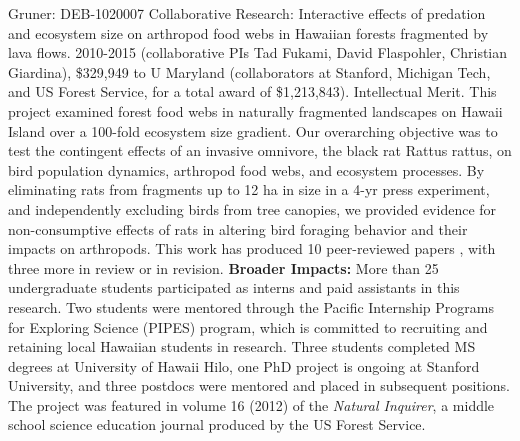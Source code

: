 \documentclass[11pt]{article}
\makeatletter
\renewcommand{\paragraph}{\@startsection{paragraph}{4}{\z@}
  {1ex \@plus 1ex \@minus .2ex}{-1em}
  {\normalfont\normalsize\it}
}
\makeatother
\begin{document}
\paragraph{Gruner:} DEB-1020007 Collaborative Research: Interactive
effects of predation and ecosystem size on arthropod food webs in
Hawaiian forests fragmented by lava flows. 2010-2015 (collaborative
PIs Tad Fukami, David Flaspohler, Christian Giardina), \$329,949 to U
Maryland (collaborators at Stanford, Michigan Tech, and US Forest
Service, for a total award of \$1,213,843). Intellectual Merit. This
project examined forest food webs in naturally fragmented landscapes
on Hawaii Island over a 100-fold ecosystem size gradient. Our
overarching objective was to test the contingent effects of an
invasive omnivore, the black rat Rattus rattus, on bird population
dynamics, arthropod food webs, and ecosystem processes. By eliminating
rats from fragments up to 12 ha in size in a 4-yr press experiment,
and independently excluding birds from tree canopies, we provided
evidence for non-consumptive effects of rats in altering bird foraging
behavior and their impacts on arthropods. This work has produced 10
peer-reviewed papers \citep{massol2011, vaughn2013, knowlton2014,
  vaughn2014, vaughn2015, knowlton2016, vannette2016}, with three more
in review or in revision. {\bf Broader Impacts:} More than 25
undergraduate students participated as interns and paid assistants in
this research. Two students were mentored through the Pacific
Internship Programs for Exploring Science (PIPES) program, which is
committed to recruiting and retaining local Hawaiian students in
research. Three students completed MS degrees at University of Hawaii
Hilo, one PhD project is ongoing at Stanford University, and three
postdocs were mentored and placed in subsequent positions. The project
was featured in volume 16 (2012) of the {\it Natural Inquirer}, a
middle school science education journal produced by the US Forest
Service.




\vbox{}
\end{document}

